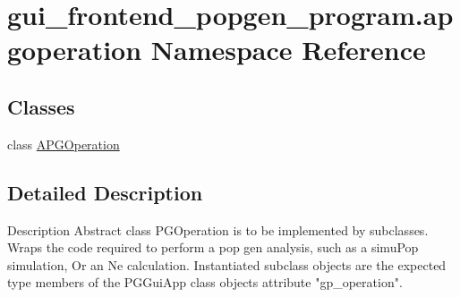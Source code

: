 \hypertarget{namespacegui__frontend__popgen__program_1_1apgoperation}{}\section{gui\+\_\+frontend\+\_\+popgen\+\_\+program.\+apgoperation Namespace Reference}
\label{namespacegui__frontend__popgen__program_1_1apgoperation}
\subsection*{Classes}
\begin{DoxyCompactItemize}
\item 
class \hyperlink{classgui__frontend__popgen__program_1_1apgoperation_1_1APGOperation}{A\+P\+G\+Operation}
\end{DoxyCompactItemize}


\subsection{Detailed Description}
\begin{DoxyVerb}Description
Abstract class PGOperation is to be implemented by subclasses.
Wraps the code required to perform a pop gen analysis, such as a simuPop simulation,
Or an Ne calculation.  Instantiated subclass objects are the expected type members 
of the PGGuiApp class objects attribute "gp_operation".\end{DoxyVerb}
 